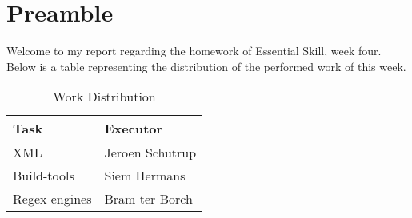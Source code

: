 \section{Preamble}
Welcome to my report regarding the homework of Essential Skill, week four. Below is a table representing the distribution of the performed work of this week.

\begin{table}[h]
\begin{center}
\begin{tabular}{ | l | l | }
	\hline
	Task		&	Executor	\\
	\hline
	XML		&	Jeroen Schutrup	\\
	\hline
	Build-tools	&	Siem Hermans	\\
	\hline
	Regex engines	&	Bram ter Borch	\\
	\hline
\end{tabular}
\caption{Work Distribution}
\label{table:distribution}
\end{center}
\end{table}
